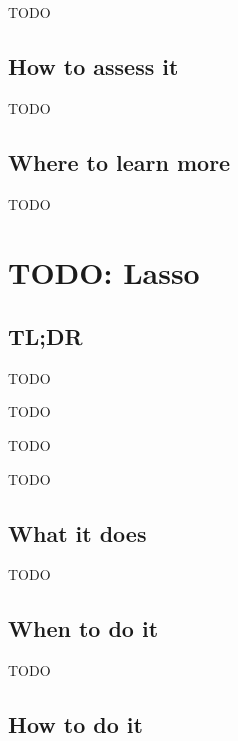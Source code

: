 \documentclass[
]{book}
\providecommand{\tightlist}{%
  \setlength{\itemsep}{0pt}\setlength{\parskip}{0pt}}
\begin{document}
TODO

\hypertarget{how-to-assess-it-13}{%
\section{How to assess it}\label{how-to-assess-it-13}}

TODO

\hypertarget{where-to-learn-more-13}{%
\section{Where to learn more}\label{where-to-learn-more-13}}

TODO

\hypertarget{lasso}{%
\chapter{TODO: Lasso}\label{lasso}}

\hypertarget{tldr-14}{%
\section{TL;DR}\label{tldr-14}}

\begin{description}
\tightlist
\item[What it does]
TODO
\item[When to do it]
TODO
\item[How to do it]
TODO
\item[How to assess it]
TODO
\end{description}

\hypertarget{what-it-does-14}{%
\section{What it does}\label{what-it-does-14}}

TODO

\hypertarget{when-to-do-it-14}{%
\section{When to do it}\label{when-to-do-it-14}}

TODO

\hypertarget{how-to-do-it-14}{%
\section{How to do it}\label{how-to-do-it-14}}
\end{document}
